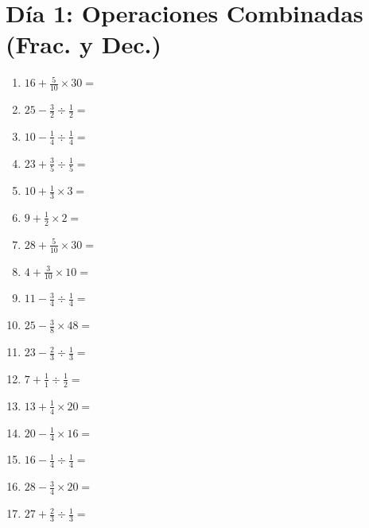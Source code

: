 \documentclass[12pt]{article}
\begin{document}
\section*{Día 1: Operaciones Combinadas (Frac. y Dec.)}
\begin{enumerate}
\item \large $ 16 + \frac{5}{10} \times 30 = $ \vspace{1.6cm}
\item \large $ 25 - \frac{3}{2} \div \frac{1}{2} = $ \vspace{1.6cm}
\item \large $ 10 - \frac{1}{4} \div \frac{1}{4} = $ \vspace{1.6cm}
\item \large $ 23 + \frac{3}{5} \div \frac{1}{5} = $ \vspace{1.6cm}
\item \large $ 10 + \frac{1}{3} \times 3 = $ \vspace{1.6cm}
\item \large $ 9 + \frac{1}{2} \times 2 = $ \vspace{1.6cm}
\item \large $ 28 + \frac{5}{10} \times 30 = $ \vspace{1.6cm}
\item \large $ 4 + \frac{3}{10} \times 10 = $ \vspace{1.6cm}
\item \large $ 11 - \frac{3}{4} \div \frac{1}{4} = $ \vspace{1.6cm}
\item \large $ 25 - \frac{3}{8} \times 48 = $ \vspace{1.6cm}
\newpage
\item \large $ 23 - \frac{2}{3} \div \frac{1}{3} = $ \vspace{1.6cm}
\item \large $ 7 + \frac{1}{1} \div \frac{1}{2} = $ \vspace{1.6cm}
\item \large $ 13 + \frac{1}{4} \times 20 = $ \vspace{1.6cm}
\item \large $ 20 - \frac{1}{4} \times 16 = $ \vspace{1.6cm}
\item \large $ 16 - \frac{1}{4} \div \frac{1}{4} = $ \vspace{1.6cm}
\item \large $ 28 - \frac{3}{4} \times 20 = $ \vspace{1.6cm}
\item \large $ 27 + \frac{2}{3} \div \frac{1}{3} = $ \vspace{1.6cm}

\end{enumerate}
\end{document}
